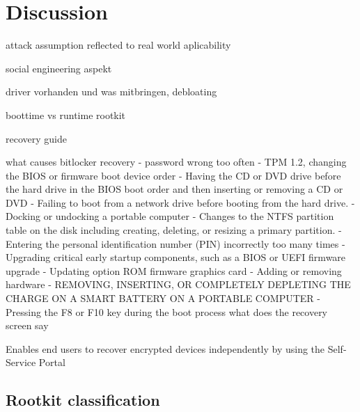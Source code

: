 

\chapter{Discussion}

attack assumption reflected to real world aplicability

social engineering aspekt

driver vorhanden und was mitbringen, debloating

boottime vs runtime rootkit


recovery guide

what causes bitlocker recovery
- password wrong too often
- TPM 1.2, changing the BIOS or firmware boot device order
- Having the CD or DVD drive before the hard drive in the BIOS boot order and then inserting or removing a CD or DVD
- Failing to boot from a network drive before booting from the hard drive.
- Docking or undocking a portable computer
- Changes to the NTFS partition table on the disk including creating, deleting, or resizing a primary partition.
- Entering the personal identification number (PIN) incorrectly too many times
- Upgrading critical early startup components, such as a BIOS or UEFI firmware upgrade
- Updating option ROM firmware graphics card
- Adding or removing hardware
- REMOVING, INSERTING, OR COMPLETELY DEPLETING THE CHARGE ON A SMART BATTERY ON A PORTABLE COMPUTER
- Pressing the F8 or F10 key during the boot process
what does the recovery screen say

Enables end users to recover encrypted devices independently by using the Self-Service Portal

\section{Rootkit classification}


